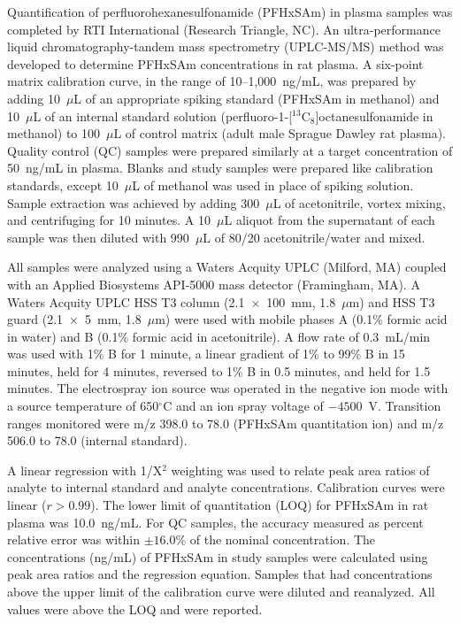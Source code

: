 Quantification of perfluorohexanesulfonamide (PFHxSAm) in plasma samples was completed by RTI International (Research Triangle, NC). An ultra-performance liquid chromatography-tandem mass spectrometry (UPLC-MS/MS) method was developed to determine PFHxSAm concentrations in rat plasma. A six-point matrix calibration curve, in the range of 10--1,000~ng/mL, was prepared by adding 10~$\mu$L of an appropriate spiking standard (PFHxSAm in methanol) and 10~$\mu$L of an internal standard solution (perfluoro-1-[$^{13}$C$_{8}$]octanesulfonamide in methanol) to 100~$\mu$L of control matrix (adult male Sprague Dawley rat plasma). Quality control (QC) samples were prepared similarly at a target concentration of 50~ng/mL in plasma. Blanks and study samples were prepared like calibration standards, except 10~$\mu$L of methanol was used in place of spiking solution. Sample extraction was achieved by adding 300~$\mu$L of acetonitrile, vortex mixing, and centrifuging for 10 minutes. A 10~$\mu$L aliquot from the supernatant of each sample was then diluted with 990~$\mu$L of 80/20 acetonitrile/water and mixed.

All samples were analyzed using a Waters Acquity UPLC (Milford, MA) coupled with an Applied Biosystems API-5000 mass detector (Framingham, MA). A Waters Acquity UPLC HSS T3 column (2.1~$\times$~100~mm, 1.8~$\mu$m) and HSS T3 guard (2.1~$\times$~5~mm, 1.8~$\mu$m) were used with mobile phases A (0.1\% formic acid in water) and B (0.1\% formic acid in acetonitrile). A flow rate of 0.3~mL/min was used with 1\% B for 1 minute, a linear gradient of 1\% to 99\% B in 15 minutes, held for 4 minutes, reversed to 1\% B in 0.5 minutes, and held for 1.5 minutes. The electrospray ion source was operated in the negative ion mode with a source temperature of 650$^{\circ}$C and an ion spray voltage of $-4500$~V. Transition ranges monitored were m/z 398.0 to 78.0 (PFHxSAm quantitation ion) and m/z 506.0 to 78.0 (internal standard).

A linear regression with 1/X$^{2}$ weighting was used to relate peak area ratios of analyte to internal standard and analyte concentrations. Calibration curves were linear ($r > 0.99$). The lower limit of quantitation (LOQ) for PFHxSAm in rat plasma was 10.0~ng/mL. For QC samples, the accuracy measured as percent relative error was within $\pm16.0\%$ of the nominal concentration. The concentrations (ng/mL) of PFHxSAm in study samples were calculated using peak area ratios and the regression equation. Samples that had concentrations above the upper limit of the calibration curve were diluted and reanalyzed. All values were above the LOQ and were reported.
